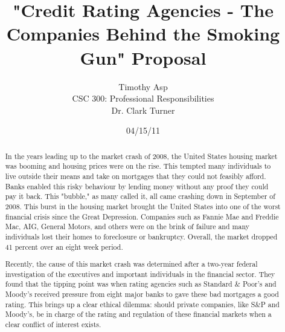 \documentclass[11pt]{article}
\begin{document}
\title{\vfill "Credit Rating Agencies - The Companies Behind the Smoking Gun" Proposal} %
\author{
Timothy Asp \vspace{10pt} \\
CSC 300: Professional Responsibilities  \vspace{10pt} \\
Dr. Clark Turner \vspace{10pt} \\
}
\date{04/15/11} %

\maketitle

\vfill  %
\begin{abstract}
In the years leading up to the market crash of 2008, the United States housing market was booming and housing prices were on the rise.  This tempted many individuals to live outside their means and take on mortgages that they could not feasibly afford.  Banks enabled this risky behaviour by lending money without any proof they could pay it back.  This "bubble," as many called it, all came crashing down in September of 2008. This burst in the housing market brought the United States into one of the worst financial crisis since the Great Depression. Companies such as Fannie Mae and Freddie Mac, AIG, General Motors, and others were on the brink of failure and many individuals lost their homes to foreclosure or bankruptcy. Overall, the market dropped 41 percent over an eight week period. \cite{marketWatch}

Recently, the cause of this market crash was determined after a two-year federal investigation of the executives and important individuals in the financial sector. They found that the tipping point was when rating agencies such as Standard \& Poor's and Moody's received pressure from eight major banks to gave these bad mortgages a good rating.  \cite{ratingEthics} This brings up a clear ethical dilemma: should private companies, like S\&P and Moody's, be in charge of the rating and regulation of these financial markets when a clear conflict of interest exists.  
\end{abstract}

\thispagestyle{empty} %
\newpage
\end{document}
